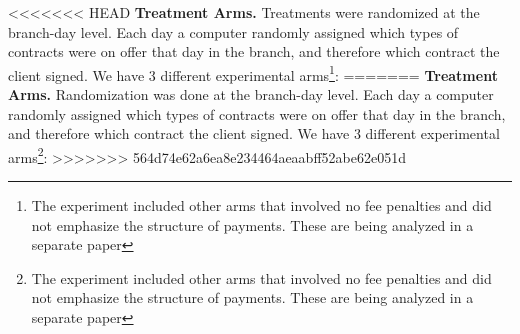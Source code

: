 \documentclass[oneside,11pt]{article}
\begin{document}

\vspace{.2in}
<<<<<<< HEAD
\noindent \textbf{Treatment Arms.} Treatments were randomized at the branch-day level. Each day a computer randomly assigned which types of contracts were on offer that day in the branch, and therefore which contract the client signed.  We have 3 different experimental arms\footnote{The experiment included other arms that involved no fee penalties and did not emphasize the structure of payments. These are being analyzed in a separate paper}: 
=======
\noindent \textbf{Treatment Arms.} Randomization was done at the branch-day level. Each day a computer randomly assigned which types of contracts were on offer that day in the branch, and therefore which contract the client signed.  We have 3 different experimental arms\footnote{The experiment included other arms that involved no fee penalties and did not emphasize the structure of payments. These are being analyzed in a separate paper}: 
>>>>>>> 564d74e62a6ea8e234464aeaabff52abe62e051d
\end{document}
